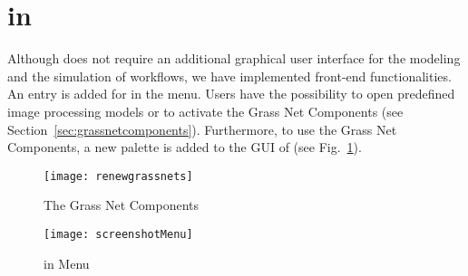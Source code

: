 \section{\RenewGrass{} in \Renew{}}
\label{sec:renewgrassinrenew}
%
Although \RenewGrass{} does not require an additional graphical user interface for the modeling and the simulation of workflows, we have implemented front-end functionalities.
%
An entry is added for \RenewGrass{} in the menu. 
%
Users have the possibility to open predefined image processing models or to activate the Grass Net Components (see Section~\ref{sec:grassnetcomponents}). 
%
Furthermore, to use the Grass Net Components, a new palette is added to the GUI of \Renew{} (see Fig.~\ref{fig:netcomp}).  
%
\begin{figure}[!t]
    \centering
  \texttt{[image: renewgrassnets]}
\caption{The Grass Net Components}
\label{fig:netcomp}
\end{figure} 

%
%

%
%

\begin{figure}[!t]
    \centering
  \texttt{[image: screenshotMenu]}
\caption{\RenewGrass{} in \Renew{} Menu}
\label{fig:grassmenu}
\end{figure}




